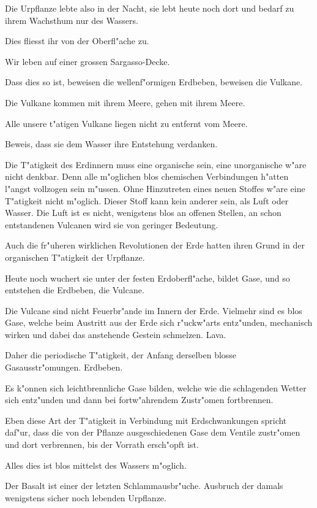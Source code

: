 \documentclass[a4paper, 11pt, oneside, german]{article}
\begin{document}
Die Urpflanze lebte also in der Nacht, sie lebt heute noch dort und bedarf zu ihrem Wachsthum nur des Wassers.

Dies fliesst ihr von der Oberfl"ache zu.

Wir leben auf einer grossen Sargasso-Decke.

Dass dies so ist, beweisen die wellenf"ormigen Erdbeben, beweisen die Vulkane.

Die Vulkane kommen mit ihrem Meere, gehen mit ihrem Meere.

Alle unsere t"atigen Vulkane liegen nicht zu entfernt vom Meere.

Beweis, dass sie dem Wasser ihre Entstehung verdanken.

Die T"atigkeit des Erdinnern muss eine organische sein, eine unorganische w"are nicht denkbar. Denn alle m"oglichen blos chemischen Verbindungen h"atten l"angst vollzogen sein m"ussen. Ohne Hinzutreten eines neuen Stoffes w"are eine T"atigkeit nicht m"oglich. Dieser Stoff kann kein anderer sein, als Luft oder Wasser. Die Luft ist es nicht, wenigstens blos an offenen Stellen, an schon entstandenen Vulcanen wird sie von geringer Bedeutung.

Auch die fr"uheren wirklichen Revolutionen der Erde hatten ihren Grund in der organischen T"atigkeit der Urpflanze.

Heute noch wuchert sie unter der festen Erdoberfl"ache, bildet Gase, und so entstehen die Erdbeben, die Vulcane.

Die Vulcane sind nicht Feuerbr"ande im Innern der Erde. Vielmehr sind es blos Gase, welche beim Austritt aus der Erde sich r"uckw"arts entz"unden, mechanisch wirken und dabei das anstehende Gestein schmelzen. Lava.

Daher die periodische T"atigkeit, der Anfang derselben blosse Gasausstr"omungen. Erdbeben.

Es k"onnen sich leichtbrennliche Gase bilden, welche wie die schlagenden Wetter sich entz"unden und dann bei fortw"ahrendem Zustr"omen fortbrennen.

Eben diese Art der T"atigkeit in Verbindung mit Erdschwankungen spricht daf"ur, dass die von der Pflanze ausgeschiedenen Gase dem Ventile zustr"omen und dort verbrennen, bis der Vorrath ersch"opft ist.

Alles dies ist blos mittelst des Wassers m"oglich.

Der Basalt ist einer der letzten Schlammausbr"uche. Ausbruch der damals wenigstens sicher noch lebenden Urpflanze.
\end{document}
